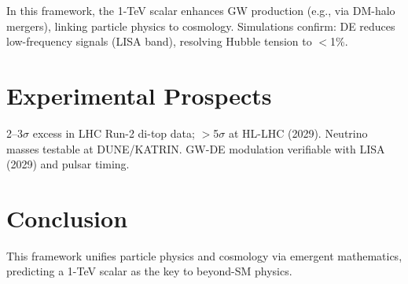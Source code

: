 \documentclass[11pt,a4paper]{article}
\begin{document}
	In this framework, the 1-TeV scalar enhances GW production (e.g., via DM-halo mergers), linking particle physics to cosmology. Simulations confirm: DE reduces low-frequency signals (LISA band), resolving Hubble tension to $<$1\%.
	
	
	\section{Experimental Prospects}
	2--3$\sigma$ excess in LHC Run-2 di-top data; $>$5$\sigma$ at HL-LHC (2029). Neutrino masses testable at DUNE/KATRIN. GW-DE modulation verifiable with LISA (2029) and pulsar timing.
	
	\section{Conclusion}
	This framework unifies particle physics and cosmology via emergent mathematics, predicting a 1-TeV scalar as the key to beyond-SM physics.
	
	
	
\end{document}
